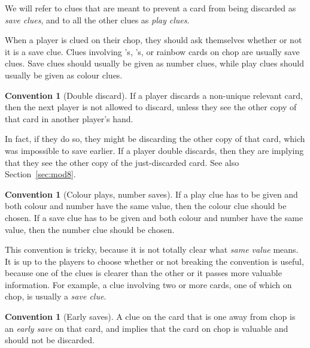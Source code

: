 \documentclass[a4paper]{article}
\theoremstyle{plain}
\theoremstyle{definition}
\newtheorem{convention}[theorem]{Convention}
\begin{document}
We will refer to clues that are meant to prevent a card from being discarded as \textit{save clues}, and to all the other clues as \textit{play clues}.

When a player is clued on their chop, they should ask themselves whether or not it is a save clue. Clues involving 's, 's, or rainbow cards on chop are usually save clues. Save clues should usually be given as number clues, while play clues should usually be given as colour clues. %

\begin{convention}[Double discard]
	\label{double-discard}
	If a player discards a non-unique relevant card, then the next player is not allowed to discard, unless they see the other copy of that card in another player's hand.
\end{convention}

In fact, if they do so, they might be discarding the other copy of that card, which was impossible to save earlier. If a player double discards, then they are implying that they see the other copy of the just-discarded card. See also Section~\ref{sec:mod8}.

\begin{convention}[Colour plays, number saves]
	If a play clue has to be given and both colour and number have the same value, then the colour clue should be chosen. If a save clue has to be given and both colour and number have the same value, then the number clue should be chosen.
\end{convention}

This convention is tricky, because it is not totally clear what \textit{same value} means. It is up to the players to choose whether or not breaking the convention is useful, because one of the clues is clearer than the other or it passes more valuable information. For example, a  clue involving two or more cards, one of which on chop, is usually a \textit{save clue}.

\begin{convention}[Early saves]
	A  clue on the card that is one away from chop is an \textit{early save} on that card, and implies that the card on chop is valuable and should not be discarded.
\end{convention}
\end{document}
